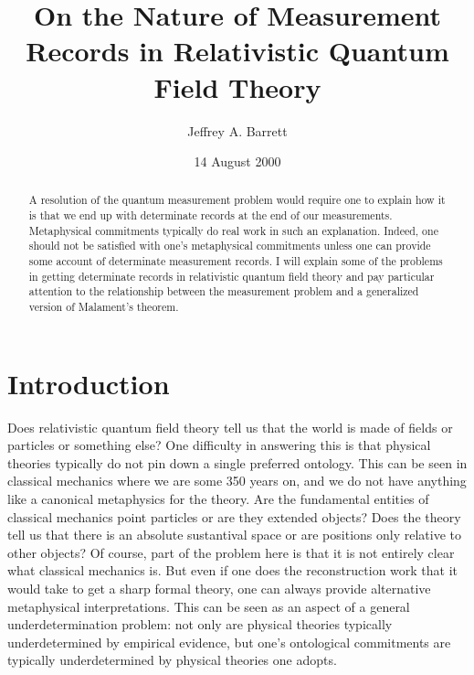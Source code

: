 \documentclass [12pt]{article}
\begin{document}
\title{On the Nature of Measurement Records in Relativistic
Quantum Field Theory}

\author{Jeffrey A. Barrett}

\date{14 August 2000}

\maketitle


\begin{abstract}
A resolution of the quantum measurement problem would require one to
explain how it is that we end up with determinate records at the end of
our measurements.  Metaphysical commitments typically do real work in
such an explanation.  Indeed, one should not be satisfied with one's
metaphysical commitments unless one can provide some account of
determinate measurement records.  I will explain some of the problems
in getting determinate records in relativistic quantum field theory and
pay particular attention to the relationship between the measurement
problem and a generalized version of Malament's theorem.
\end{abstract}


\section{Introduction}

Does relativistic quantum field theory tell us that the world is made
of fields or particles or something else?  One difficulty in answering
this is that physical theories typically do not pin down a
single preferred ontology.  This can be seen in classical
mechanics where we are some 350 years on, and we do not have anything like
a canonical metaphysics for the theory.  Are the fundamental entities of classical
mechanics point particles or are they extended objects?  Does the
theory tell us that there is an absolute sustantival space or are
positions only relative to other objects?  Of course, part of the
problem here is that it is not entirely clear what classical mechanics is.
But even if one does the reconstruction work that it would take to
get a sharp formal theory, one can always provide alternative
metaphysical interpretations.  This can be seen as an aspect of a
general underdetermination problem: not only are physical theories
typically underdetermined by empirical evidence, but one's ontological
commitments are typically underdetermined by physical
theories one adopts.
\end{document}
